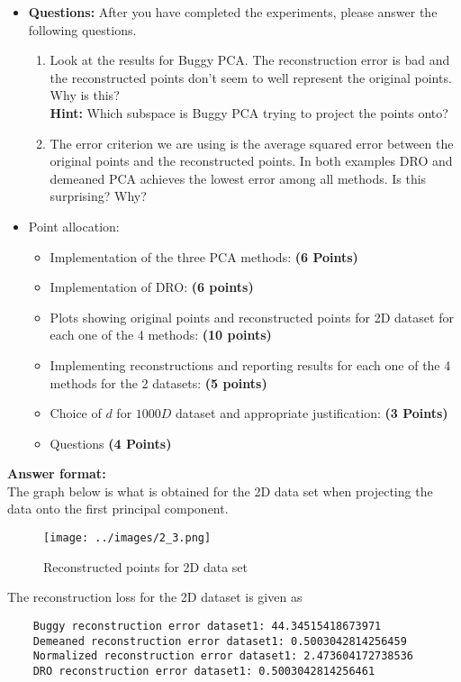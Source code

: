 \documentclass[a4paper]{article}
\theoremstyle{definition}
\begin{document}
\begin{itemize}
\item \textbf{Questions:} After you have completed the experiments, please answer the following questions.
\begin{enumerate}
\item Look at the results for Buggy PCA. The reconstruction error is bad and the
reconstructed points don't seem to well represent the original points. Why is
this? \\
\textbf{Hint: } Which subspace is Buggy PCA trying to project the points
onto?
\item The error criterion we are using is the average squared error 
between the original points and the reconstructed points.
In both examples DRO and demeaned PCA achieves the lowest error among all
methods. 
Is this surprising? Why?
\end{enumerate}

\item Point allocation:
\begin{itemize}
\item Implementation of the three PCA methods: \textbf{(6 Points)}
\item Implementation of DRO: \textbf{(6 points)}
\item Plots showing original points and reconstructed points for 2D dataset for each one of the 4 methods: \textbf{(10 points)}
\item Implementing reconstructions and reporting results for each one of the 4 methods for the 2 datasets: \textbf{(5 points)}
\item Choice of $d$ for $1000D$ dataset and appropriate justification:
\textbf{(3 Points)}
\item Questions \textbf{(4 Points)}
\end{itemize}

\end{itemize}



\vspace{0.2in}

\textbf{Answer format:}  \\
The graph below is what is obtained for the 2D data set when projecting the data onto the first principal component. \\
\begin{figure}[H]
    \centering
    \texttt{[image: ../images/2\_3.png]}
    \caption{Reconstructed points for 2D data set}
    \label{fig:rec_2d}
\end{figure}
The reconstruction loss for the 2D dataset is given as
\begin{verbatim}
    Buggy reconstruction error dataset1: 44.34515418673971
    Demeaned reconstruction error dataset1: 0.5003042814256459
    Normalized reconstruction error dataset1: 2.473604172738536
    DRO reconstruction error dataset1: 0.5003042814256461
\end{verbatim}
\end{document}
